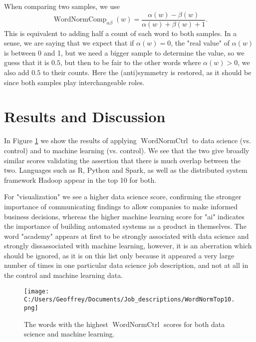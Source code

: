 \documentclass[12pt]{article}
\DeclareMathOperator{\WNt}{WordNormCtrl}
\DeclareMathOperator{\WNp}{WordNormComp}
\begin{document}
When comparing two samples, we use
\begin{equation} \label{eqn:WordNormComp}
 \WNp_{\alpha\beta}(w) = \frac{\alpha(w) - \beta(w)}{\alpha(w) + \beta(w) +1}.
\end{equation}
This is equivalent to adding half a count of each word to both samples. In a sense, we are saying that we expect that if $\alpha(w)=0$, the "real value" of $\alpha(w)$ is between 0 and 1, but we need a bigger sample to determine the value, so we guess that it is $0.5$, but then to be fair to the other words where $\alpha(w)>0$, we also add $0.5$ to their counts. Here the (anti)symmetry is restored, as it should be since both samples play interchangeable roles. \\
 

\section{Results and Discussion} In Figure \ref{fig:WNt} we show the results of applying $\WNt$ to data science (vs. control) and to machine learning (vs. control). We see that the two give broadly similar scores validating the assertion that there is much overlap between the two. Languages such as R, Python and Spark, as well as the distributed system framework Hadoop appear in the top 10 for both.

For "visualization" we see a higher data science score, confirming the stronger importance of communicating findings to allow companies to make informed business decisions, whereas the higher machine learning score for "ai" indicates the importance of building automated systems as a product in themselves. The word "academy" appears at first to be strongly associated with data science and strongly dissassociated with machine learning, however, it is an aberration which should be ignored, as it is on this list only because it appeared a very large number of times in one particular data science job description, and not at all in the control and machine learning data.

\begin{figure}[h]
\begin{center}
\texttt{[image: C:/Users/Geoffrey/Documents/Job\_descriptions/WordNormTop10.png]}
\end{center}
\caption{\label{fig:WNt} The words with the highest $\WNt$ scores for both data science and machine learning.}
\end{figure}
\end{document}
